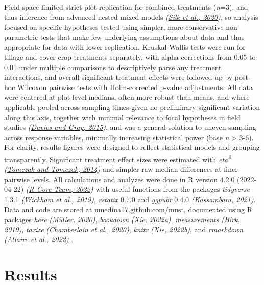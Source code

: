 \documentclass[
  12pt,
]{article}
\begin{document}
Field space limited strict plot replication for combined treatments (\emph{n}=3), and thus inference from advanced nested mixed models \emph{(\protect\hyperlink{ref-silk20}{Silk et al., 2020})}, so analysis focused on specific hypotheses tested using simpler, more conservative non-parametric tests that make few underlying assumptions about data and thus appropriate for data with lower replication.
Kruskal-Wallis tests were run for tillage and cover crop treatments separately, with alpha corrections from 0.05 to 0.01 under multiple comparisons to descriptively parse any treatment interactions, and overall significant treatment effects were followed up by post-hoc Wilcoxon pairwise tests with Holm-corrected p-value adjustments.
All data were centered at plot-level medians, often more robust than means, and where applicable pooled across sampling times given no preliminary significant variation along this axis, together with minimal relevance to focal hypotheses in field studies \emph{(\protect\hyperlink{ref-davies15b}{Davies and Gray, 2015})}, and was a general solution to uneven sampling across response variables, minimally increasing statistical power (base \emph{n} \textgreater{} 3-6).
For clarity, results figures were designed to reflect statistical models and grouping transparently.
Significant treatment effect sizes were estimated with \emph{eta\textsuperscript{2}} \emph{(\protect\hyperlink{ref-tomczak14}{Tomczak and Tomczak, 2014})} and simpler raw median differences at finer pairwise levels.
All calculations and analyzes were done in R version 4.2.0 (2022-04-22) \emph{(\protect\hyperlink{ref-base}{R Core Team, 2022})} with useful functions from the packages \emph{tidyverse} 1.3.1 \emph{(\protect\hyperlink{ref-tidyverse}{Wickham et al., 2019})}, \emph{rstatix} 0.7.0 and \emph{ggpubr} 0.4.0 \emph{(\protect\hyperlink{ref-rstatix}{Kassambara, 2021})}.
Data and code are stored at \url{nmedina17.github.com/must},
documented using R packages \emph{here} \emph{(\protect\hyperlink{ref-here}{Müller, 2020})}, \emph{bookdown} \emph{(\protect\hyperlink{ref-bookdown2022}{Xie, 2022a})}, \emph{measurements} \emph{(\protect\hyperlink{ref-measurements}{Birk, 2019})}, \emph{taxize} \emph{(\protect\hyperlink{ref-taxize2020}{Chamberlain et al., 2020})}, \emph{knitr} \emph{(\protect\hyperlink{ref-knitr2022}{Xie, 2022b})}, and \emph{rmarkdown} \emph{(\protect\hyperlink{ref-rmarkdown2022}{Allaire et al., 2022})}
.

\hypertarget{results}{%
\section{Results}\label{results}}
\end{document}
